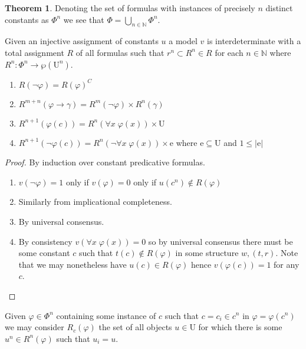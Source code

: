 \documentclass{amsbook}
\newcommand{\univ}[1]{\mathord\forall#1\;}
\newcommand{\then}{\mathrel\rightarrow}
\theoremstyle{definition}
\newtheorem{thm}{Theorem}[section]
\begin{document}
\begin{thm}
    Denoting the set of formulas with instances of precisely $n$ distinct constants as $\Phi^n$ we see that $\Phi = \bigcup_{n \in \mathbb N} \Phi^n$.

    Given an injective assignment of constants $u$ a model $v$ is interdeterminate with a total assignment $R$ of all formulas such that $r^n \subset R^n \in R$ for each $n \in \mathbb N$ where $R^n: \Phi^n \longrightarrow \wp(\mathrm U^n)$.
    \begin{enumerate}
        \item $R(\neg\varphi) = R(\varphi)^C$
        \item $R^{m+n}(\varphi \then \gamma) = R^{m}(\neg\varphi) \times R^n(\gamma)$
        \item $R^{n+1}(\varphi(c)) = R^n(\univ x \varphi(x)) \times \mathrm U$
        \item $R^{n+1}(\neg\varphi(c)) = R^n(\neg\univ x \varphi(x)) \times \mathrm e$ where $\mathrm e \subseteq \mathrm U$ and $1 \leq |\mathrm e|$
    \end{enumerate}
    \begin{proof}
        By induction over constant predicative formulas.
        \begin{enumerate}
            \item $v(\neg\varphi) = 1$ only if $v(\varphi) = 0$ only if $u(c^n) \notin R(\varphi)$
            \item Similarly from implicational completeness.
            \item By universal consensus.
            \item By consistency $v(\univ x \varphi(x)) = 0$ so by universal consensus there must be some constant $c$ such that $t(c) \notin R(\varphi)$ in some structure $w, (t, r)$. Note that we may nonetheless have $u(c) \in R(\varphi)$ hence $v(\varphi(c)) = 1$ for any $c$.
        \end{enumerate}
    \end{proof}
\end{thm}








\newpage



Given $\varphi \in \Phi^n$ containing some instance of $c$ such that $c = c_i \in c^n$ in $\varphi = \varphi(c^n)$ we may consider $R_c(\varphi)$ the set of all objects $u \in \mathrm U$ for which there is some $u^n \in R^n(\varphi)$ such that $u_i = u$.
\end{document}
